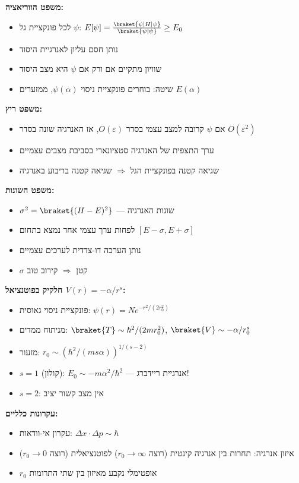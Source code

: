 \begin{summarybox}{}
\textbf{משפט הווריאציה:}
\begin{itemize}
    \item לכל פונקציית גל $\psi$: $E[\psi] = \frac{\braket{\psi|H|\psi}}{\braket{\psi|\psi}} \geq E_0$
    \item נותן חסם עליון לאנרגיית היסוד
    \item שוויון מתקיים אם ורק אם $\psi$ היא מצב היסוד
    \item שיטה: בוחרים פונקציית ניסוי $\psi(\alpha)$, ממזערים $E(\alpha)$
\end{itemize}

\textbf{משפט ריץ:}
\begin{itemize}
    \item אם $\psi$ קרובה למצב עצמי בסדר $O(\varepsilon)$, אז האנרגיה שונה בסדר $O(\varepsilon^2)$
    \item ערך התצפית של האנרגיה סטציונארי בסביבת מצבים עצמיים
    \item שגיאה קטנה בפונקציית הגל $\Rightarrow$ שגיאה קטנה בריבוע באנרגיה
\end{itemize}

\textbf{משפט השונות:}
\begin{itemize}
    \item $\sigma^2 = \braket{(H - E)^2}$ — שונות האנרגיה
    \item לפחות ערך עצמי אחד נמצא בתחום $[E - \sigma, E + \sigma]$
    \item נותן הערכה דו-צדדית לערכים עצמיים
    \item $\sigma$ קטן $\Rightarrow$ קירוב טוב
\end{itemize}

\textbf{חלקיק בפוטנציאל $V(r) = -\alpha/r^s$:}
\begin{itemize}
    \item פונקציית ניסוי גאוסית: $\psi(r) = Ne^{-r^2/(2r_0^2)}$
    \item מניתוח ממדים: $\braket{T} \sim \hbar^2/(2mr_0^2)$, $\braket{V} \sim -\alpha/r_0^s$
    \item מזעור: $r_0 \sim (\hbar^2/(ms\alpha))^{1/(s-2)}$
    \item $s = 1$ (קולון): $E_0 \sim -m\alpha^2/\hbar^2$ — אנרגיית ריידברג!
    \item $s = 2$: אין מצב קשור יציב
\end{itemize}

\textbf{עקרונות כלליים:}
\begin{itemize}
    \item עקרון אי-וודאות: $\Delta x \cdot \Delta p \sim \hbar$
    \item איזון אנרגיה: תחרות בין אנרגיה קינטית (רוצה $r_0 \to \infty$) לפוטנציאלית (רוצה $r_0 \to 0$)
    \item $r_0$ אופטימלי נקבע מאיזון בין שתי התרומות
\end{itemize}
\end{summarybox}

